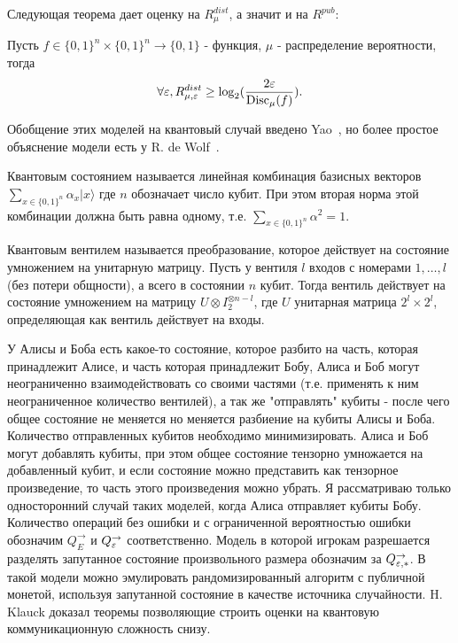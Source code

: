 \documentclass{article}
\begin{document}
  Следующая теорема дает оценку на $R^{dist}_{\mu}$, а значит и на $R^{pub}$:~\cite{nisan}
   \begin{theorem}
    Пусть $f \in \{0, 1\}^n\times \{0, 1\}^n \to \{0, 1\}$ - функция, $\mu$ - распределение вероятности, тогда $$\forall \varepsilon, R_{\mu, \varepsilon}^{dist} \geq \log_2(\frac{2\varepsilon}{\operatorname{Disc}_{\mu}(f)}).$$
   \end{theorem}
Обобщение этих моделей на квантовый случай введено Yao~\cite{yaoquant}, но более простое объяснение модели есть у R. de Wolf~\cite{wolf}.
\begin{definition}
    Квантовым состоянием называется линейная комбинация базисных векторов $\sum_{x \in \{0, 1\}^n}\alpha_{x}|x\rangle$ где $n$ обозначает число кубит. При этом вторая норма этой комбинации должна быть равна одному, т.е. $\sum_{x \in \{0, 1\}^n} \alpha^2 = 1$. 
\end{definition}
\begin{definition}
    Квантовым вентилем называется преобразование, которое действует на состояние умножением на унитарную матрицу. Пусть у вентиля $l$ входов с номерами $1, \ldots, l$ (без потери общности), а всего в состоянии $n$ кубит. Тогда вентиль действует на состояние умножением на матрицу $U \otimes I_2^{\otimes n - l}$, где $U$ унитарная матрица $2^l \times 2^l$, определяющая как вентиль действует на входы. 
\end{definition}
У Алисы и Боба есть какое-то состояние, которое разбито на часть, которая принадлежит Алисе, и часть которая принадлежит Бобу, Алиса и Боб могут неограниченно взаимодействовать со своими частями (т.е. применять к ним неограниченное количество вентилей), а так же "отправлять" кубиты - после чего общее состояние не меняется но меняется разбиение на кубиты Алисы и Боба. Количество отправленных кубитов необходимо минимизировать. Алиса и Боб могут добавлять кубиты, при этом общее состояние тензорно умножается на добавленный кубит, и если состояние можно представить как тензорное произведение, то часть этого произведения можно убрать. Я рассматриваю только односторонний случай таких моделей, когда Алиса отправляет кубиты Бобу. Количество операций без ошибки и с ограниченной вероятностью ошибки обозначим $Q_{E}^{\to}$ и $Q_{\varepsilon}^{\to}$ соответственно. Модель в которой игрокам разрешается разделять запутанное состояние произвольного размера обозначим за $Q_{\varepsilon, *}^{\to}$. В такой модели можно эмулировать рандомизированный алгоритм с публичной монетой, используя запутанной состояние в качестве источника случайности. H. Klauck доказал теоремы позволяющие строить оценки на квантовую коммуникационную сложность снизу.
\end{document}
